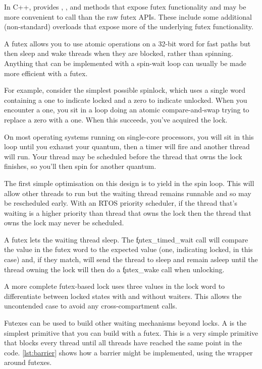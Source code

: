 

\begin{note}
	In C++,  provides , , and  methods that expose futex functionality and may be more convenient to call than the raw futex APIs.
	These include some additional (non-standard) overloads that expose more of the underlying futex functionality.
\end{note}

A futex allows you to use atomic operations on a 32-bit word for fast paths but then sleep and wake threads when they are blocked, rather than spinning.
Anything that can be implemented with a spin-wait loop can usually be made more efficient with a futex.

For example, consider the simplest possible spinlock, which uses a single word containing a one to indicate locked and a zero to indicate unlocked.
When you encounter a one, you sit in a loop doing an atomic compare-and-swap trying to replace a zero with a one.
When this succeeds, you've acquired the lock.

On most operating systems running on single-core processors, you will sit in this loop until you exhaust your quantum, then a timer will fire and another thread will run.
Your thread may be scheduled before the thread that owns the lock finishes, so you'll then spin for another quantum.

The first simple optimisation on this design is to yield in the spin loop.
This will allow other threads to run but the waiting thread remains runnable and so may be rescheduled early.
With an RTOS priority scheduler, if the thread that's waiting is a higher priority than thread that owns the lock then the thread that owns the lock may never be scheduled.

A futex lets the waiting thread sleep.
The \c{futex_timed_wait} call will compare the value in the futex word to the expected value (one, indicating locked, in this case) and, if they match, will send the thread to sleep and remain asleep until the thread owning the lock will then do a \c{futex_wake} call when unlocking.

A more complete futex-based lock uses three values in the lock word to differentiate between locked states with and without waiters.
This allows the uncontended case to avoid any cross-compartment calls.

Futexes can be used to build other waiting mechanisms beyond locks.
A  is the simplest primitive that you can build with a futex.
This is a very simple primitive that blocks every thread until all threads have reached the same point in the code.
\ref{lst:barrier} shows how a barrier might be implemented, using the  wrapper around futexes.

